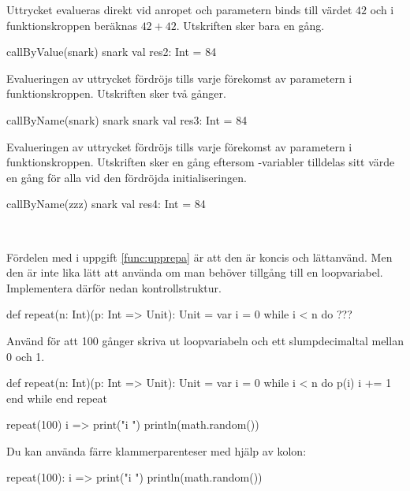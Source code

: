 \SubtaskSolved Uttrycket  evalueras direkt vid anropet och parametern  binds till värdet $42$ och i funktionskroppen beräknas $42+42$. Utskriften sker bara en gång.
\begin{REPL}
callByValue(snark)
snark val res2: Int = 84
\end{REPL}

\SubtaskSolved Evalueringen av uttrycket  fördröjs tills varje förekomst av parametern  i funktionskroppen. Utskriften sker två gånger.
\begin{REPL}
callByName(snark)
snark snark val res3: Int = 84
\end{REPL}

\SubtaskSolved Evalueringen av uttrycket  fördröjs tills varje förekomst av parametern  i funktionskroppen. Utskriften sker en gång eftersom -variabler tilldelas sitt värde en gång för alla vid den fördröjda initialiseringen.
\begin{REPL}
callByName(zzz)
snark val res4: Int = 84
\end{REPL}

\QUESTEND




\QUESTBEGIN

\Task  \what~

\Subtask Fördelen med  i uppgift \ref{func:upprepa} är att den är koncis och lättanvänd. Men den är inte lika lätt att använda om man behöver tillgång till en loopvariabel. Implementera därför nedan kontrollstruktur.

\begin{Code}
def repeat(n: Int)(p: Int => Unit): Unit = 
  var i = 0
  while i < n do
    ??? 
\end{Code}

\Subtask Använd  för att 100 gånger skriva ut loopvariabeln och ett slumpdecimaltal mellan 0 och 1.


\SOLUTION

\TaskSolved \what

\SubtaskSolved
\begin{Code}
def repeat(n: Int)(p: Int => Unit): Unit = 
  var i = 0
  while i < n do
    p(i)
    i += 1
  end while
end repeat
\end{Code}

\SubtaskSolved

\begin{Code}
repeat(100){ i =>
  print("i ")
  println(math.random())
}
\end{Code}
Du kan använda färre klammerparenteser med hjälp av kolon:
\begin{Code}
repeat(100): i =>
  print("i ")
  println(math.random())
\end{Code}

